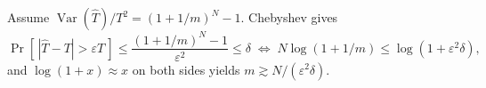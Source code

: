 \documentclass[12pt]{article}
\begin{document}
Assume $\operatorname{Var}(\hat T)/T^2 = (1+1/m)^N - 1$. Chebyshev gives
\[
  \Pr[\,|\hat T - T| > \varepsilon T\,] \le \frac{(1+1/m)^N - 1}{\varepsilon^2} \le \delta
  \;\iff\; N\log(1+1/m) \le \log(1+\varepsilon^2\delta),
\]
and $\log(1+x)\approx x$ on both sides yields $m \gtrsim N/(\varepsilon^2 \delta)$.
\end{document}
